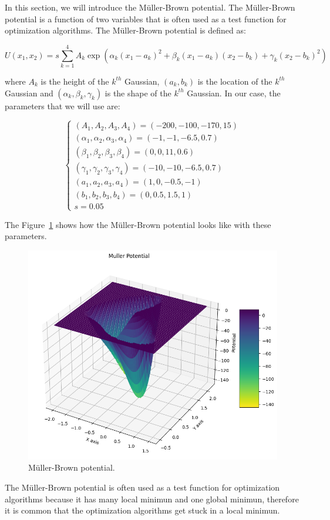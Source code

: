 \documentclass{article}
\begin{document}
In this section, we will introduce the Müller-Brown potential. The Müller-Brown potential is a function of two variables that is often used as a test function for optimization algorithms. The Müller-Brown potential is defined as:

\[
	U(x_1, x_2) = s \sum_{k=1}^4 A_k \exp(\alpha_k(x_1 - a_k)^2 + \beta_k(x_1 - a_k)(x_2 - b_k) + \gamma_k(x_2 - b_k)^2)
\]

where \(A_k\) is the height of the \(k^{th}\) Gaussian, \((a_k, b_k)\) is the location of the \(k^{th}\) Gaussian and \((\alpha_k, \beta_k, \gamma_k)\) is the shape of the \(k^{th}\) Gaussian. In our case, the parameters that we will use are:

\[
	\begin{cases}
		(A_1, A_2, A_3, A_4) = (-200, -100, -170, 15) \\
		(\alpha_1, \alpha_2, \alpha_3, \alpha_4) = (-1, -1, -6.5, 0.7) \\
		(\beta_1, \beta_2, \beta_3, \beta_4) = (0, 0, 11, 0.6) \\
		(\gamma_1, \gamma_2, \gamma_3, \gamma_4) = (-10, -10, -6.5, 0.7) \\
		(a_1, a_2, a_3, a_4) = (1, 0, -0.5, -1) \\
		(b_1, b_2, b_3, b_4) = (0, 0.5, 1.5, 1) \\
		s = 0.05
	\end{cases}
\]

The Figure~\ref{fig:mullerbrown} shows how the Müller-Brown potential looks like with these parameters.

\begin{figure}[H]
	\centering
	\includegraphics[width=0.5\linewidth]{./Figures/MCMC/mullerbrown.png}
	\caption{Müller-Brown potential.}
	\label{fig:mullerbrown}
\end{figure}

The Müller-Brown potential is often used as a test function for optimization algorithms because it has many local minimun and one global minimun, therefore it is common that the optimization algorithms get stuck in a local minimun.
\end{document}
